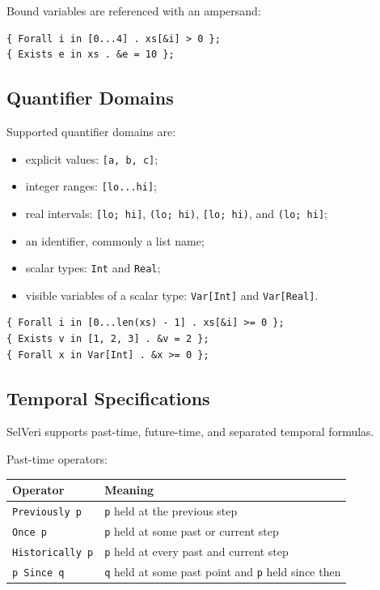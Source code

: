 \documentclass[11pt]{article}
\begin{document}
Bound variables are referenced with an ampersand:

\begin{lstlisting}
{ Forall i in [0...4] . xs[&i] > 0 };
{ Exists e in xs . &e = 10 };
\end{lstlisting}

\subsection{Quantifier Domains}

Supported quantifier domains are:

\begin{itemize}[nosep]
  \item explicit values: \texttt{[a, b, c]};
  \item integer ranges: \texttt{[lo...hi]};
  \item real intervals: \texttt{[lo; hi]}, \texttt{(lo; hi)}, \texttt{[lo; hi)}, and \texttt{(lo; hi]};
  \item an identifier, commonly a list name;
  \item scalar types: \texttt{Int} and \texttt{Real};
  \item visible variables of a scalar type: \texttt{Var[Int]} and \texttt{Var[Real]}.
\end{itemize}

\begin{lstlisting}
{ Forall i in [0...len(xs) - 1] . xs[&i] >= 0 };
{ Exists v in [1, 2, 3] . &v = 2 };
{ Forall x in Var[Int] . &x >= 0 };
\end{lstlisting}

\subsection{Temporal Specifications}

SelVeri supports past-time, future-time, and separated temporal formulas.

Past-time operators:

\begin{center}
\begin{tabular}{ll}
\toprule
Operator & Meaning \\
\midrule
\texttt{Previously p} & \texttt{p} held at the previous step \\
\texttt{Once p} & \texttt{p} held at some past or current step \\
\texttt{Historically p} & \texttt{p} held at every past and current step \\
\texttt{p Since q} & \texttt{q} held at some past point and \texttt{p} held since then \\
\bottomrule
\end{tabular}
\end{center}
\end{document}
